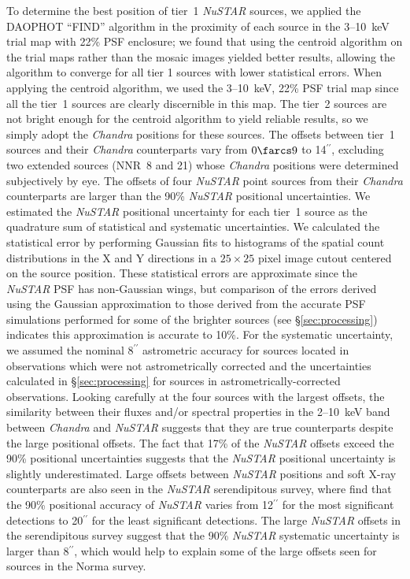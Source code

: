 \documentclass[iop,revtex4]{emulateapj}
\begin{document}
To determine the best position of tier~1 \textit{NuSTAR} sources, we applied the DAOPHOT ``FIND'' algorithm in the proximity of each source in the 3--10~keV trial map with 22\% PSF enclosure; we found that using the centroid algorithm on the trial maps rather than the mosaic images yielded better results, allowing the algorithm to converge for all tier 1 sources with lower statistical errors.  When applying the centroid algorithm, we used the 3--10~keV, 22\% PSF trial map since all the tier~1 sources are clearly discernible in this map.  The tier~2 sources are not bright enough for the centroid algorithm to yield reliable results, so we simply adopt the \textit{Chandra} positions for these sources.  The offsets between tier~1 sources and their \textit{Chandra} counterparts vary from $0\farcs9$ to 14$^{\prime\prime}$, excluding two extended sources (NNR~8 and 21) whose \textit{Chandra} positions were determined subjectively by eye.  The offsets of four \textit{NuSTAR} point sources from their \textit{Chandra} counterparts are larger than the 90\% \textit{NuSTAR} positional uncertainties.  We estimated the \textit{NuSTAR} positional uncertainty for each tier~1 source as the quadrature sum of statistical and systematic uncertainties.  We calculated the statistical error by performing Gaussian fits to histograms of the spatial count distributions in the X and Y directions in a $25\times25$ pixel image cutout centered on the source position.  These statistical errors are approximate since the \textit{NuSTAR} PSF has non-Gaussian wings, but comparison of the errors derived using the Gaussian approximation to those derived from the accurate PSF simulations performed for some of the brighter sources (see \S\ref{sec:processing}) indicates this approximation is accurate to 10\%.  For the systematic uncertainty, we assumed the nominal $8^{\prime\prime}$ astrometric accuracy \citep{harrison13} for sources located in observations which were not astrometrically corrected and the uncertainties calculated in \S\ref{sec:processing} for sources in astrometrically-corrected observations.  Looking carefully at the four sources with the largest offsets, the similarity between their fluxes and/or spectral properties in the 2--10~keV band between \textit{Chandra} and \textit{NuSTAR} suggests that they are true counterparts despite the large positional offsets.  The fact that 17\% of the \textit{NuSTAR} offsets exceed the 90\% positional uncertainties suggests that the \textit{NuSTAR} positional uncertainty is slightly underestimated.  Large offsets between \textit{NuSTAR} positions and soft X-ray counterparts are also seen in the \textit{NuSTAR} serendipitous survey, where \citet{lansbury16} find that the 90\% positional accuracy of \textit{NuSTAR} varies from 12$^{\prime\prime}$ for the most significant detections to 20$^{\prime\prime}$ for the least significant detections.  The large \textit{NuSTAR} offsets in the serendipitous survey suggest that the 90\% \textit{NuSTAR} systematic uncertainty is larger than 8$^{\prime\prime}$, which would help to explain some of the large offsets seen for sources in the Norma survey. \par
\end{document}
